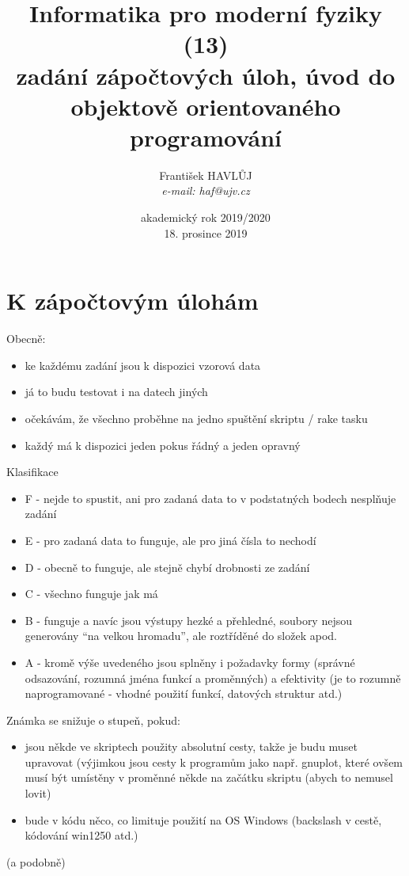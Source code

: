 \documentclass{beamer}
\title[IMF (13)]{Informatika pro moderní fyziky (13)\\ zadání zápočtových úloh, úvod do objektově orientovaného programování}
\author[Franti\v{s}ek HAVL\r{U}J, ORF ÚJV Řež]{Franti\v{s}ek HAVL\r{U}J\\{\scriptsize \emph{e-mail: haf@ujv.cz}}}
\date{akademický rok 2019/2020\\18. prosince 2019}
\institute[ORF ÚJV Řež]
{ÚJV Řež\\oddělení Reaktorové fyziky a podpory palivového cyklu}
\begin{document}
\begin{frame}
  \titlepage
\end{frame}

\begin{frame}
  \tableofcontents
\end{frame}

\section{K zápočtovým úlohám}

\begin{frame}{Obecně:}
\begin{itemize}
  \item ke každému zadání jsou k dispozici vzorová data
  \item já to budu testovat i na datech jiných
  \item očekávám, že všechno proběhne na jedno spuštění skriptu / rake tasku
  \item každý má k dispozici jeden pokus řádný a jeden opravný
\end{itemize}
\end{frame}

\begin{frame}{Klasifikace}
  \begin{itemize}
    \item F - nejde to spustit, ani pro zadaná data to v podstatných bodech nesplňuje zadání
    \item E - pro zadaná data to funguje, ale pro jiná čísla to nechodí
    \item D - obecně to funguje, ale stejně chybí drobnosti ze zadání
    \item C - všechno funguje jak má
    \item B - funguje a navíc jsou výstupy hezké a přehledné, soubory nejsou generovány “na velkou hromadu”, ale roztříděné do složek apod.
    \item A - kromě výše uvedeného jsou splněny i požadavky formy (správné odsazování, rozumná jména funkcí a proměnných) a efektivity (je to rozumně naprogramované - vhodné použití funkcí, datových struktur atd.)
  \end{itemize}
\end{frame}

\begin{frame}{Známka se snižuje o stupeň, pokud:}
  \begin{itemize}
    \item jsou někde ve skriptech použity absolutní cesty, takže je budu muset upravovat (výjimkou jsou cesty k programům jako např. gnuplot, které ovšem musí být umístěny v proměnné někde na začátku skriptu (abych to nemusel lovit)
    \item bude v kódu něco, co limituje použití na OS Windows (backslash v cestě, kódování win1250 atd.)
  \end{itemize}
  (a podobně)
\end{frame}
\end{document}

